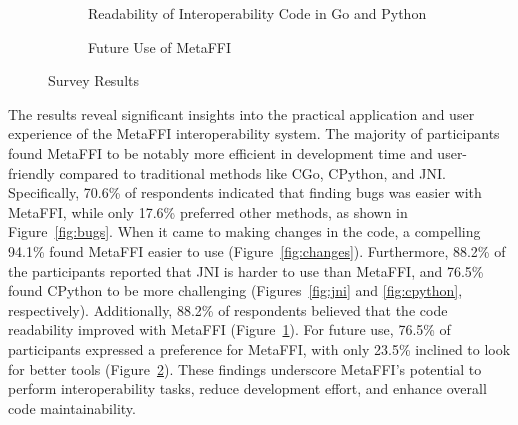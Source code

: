 \documentclass[sigplan,10pt,manuscript,nonacm]{acmart}
\begin{document}
\begin{figure}[h!]
    \vspace{1cm} %

    \begin{subfigure}[b]{0.48\textwidth}
        \centering
        \caption{Readability of Interoperability Code in Go and Python}
        \label{fig:readability}
    \end{subfigure}
    \hfill
    \begin{subfigure}[b]{0.48\textwidth}
        \centering
        \caption{Future Use of MetaFFI}
        \label{fig:future}
    \end{subfigure}
\caption{Survey Results}
\label{fig:survey}
\end{figure}

The results reveal significant insights into the practical application and user experience of the MetaFFI interoperability system. The majority of participants found MetaFFI to be notably more efficient in development time and user-friendly compared to traditional methods like CGo, CPython, and JNI. Specifically, 70.6\% of respondents indicated that finding bugs was easier with MetaFFI, while only 17.6\% preferred other methods, as shown in Figure~\ref{fig:bugs}. When it came to making changes in the code, a compelling 94.1\% found MetaFFI easier to use (Figure~\ref{fig:changes}). Furthermore, 88.2\% of the participants reported that JNI is harder to use than MetaFFI, and 76.5\% found CPython to be more challenging (Figures~\ref{fig:jni} and \ref{fig:cpython}, respectively). Additionally, 88.2\% of respondents believed that the code readability improved with MetaFFI (Figure~\ref{fig:readability}). For future use, 76.5\% of participants expressed a preference for MetaFFI, with only 23.5\% inclined to look for better tools (Figure~\ref{fig:future}). These findings underscore MetaFFI's potential to perform interoperability tasks, reduce development effort, and enhance overall code maintainability.
\end{document}
